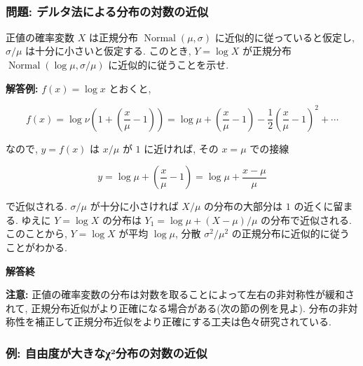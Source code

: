 \documentclass[10pt, a4paper,xelatex,ja=standard]{bxjsarticle}
\newcommand\op{\operatorname}
\begin{document}
    \begin{center}
    \end{center}
    { \hspace*{\fill} \\}
    

    \hypertarget{ux554fux984c-ux30c7ux30ebux30bfux6cd5ux306bux3088ux308bux5206ux5e03ux306eux5bfeux6570ux306eux8fd1ux4f3c}{%
\subsubsection{問題:
デルタ法による分布の対数の近似}\label{ux554fux984c-ux30c7ux30ebux30bfux6cd5ux306bux3088ux308bux5206ux5e03ux306eux5bfeux6570ux306eux8fd1ux4f3c}}

正値の確率変数 \(X\) は正規分布 \(\op{Normal}(\mu, \sigma)\)
に近似的に従っていると仮定し, \(\sigma/\mu\) は十分に小さいと仮定する.
このとき, \(Y = \log X\) が正規分布
\(\op{Normal}(\log \mu, \sigma/\mu)\) に近似的に従うことを示せ.

\textbf{解答例:} \(f(x)=\log x\) とおくと,

\[
f(x) = \log\nu\left(1 + \left(\frac{x}{\mu}-1\right)\right) =
\log\mu + \left(\frac{x}{\mu}-1\right) - \frac{1}{2}\left(\frac{x}{\mu}-1\right)^2 + \cdots
\]

なので, \(y = f(x)\) は \(x/\mu\) が \(1\) に近ければ, その \(x=\mu\)
での接線

\[
y = \log\mu + \left(\frac{x}{\mu}-1\right) =
\log\mu + \frac{x-\mu}{\mu}
\]

で近似される. \(\sigma/\mu\) が十分に小さければ \(X/\mu\)
の分布の大部分は \(1\) の近くに留まる. ゆえに \(Y=\log X\) の分布は
\(Y_1 = \log\mu + (X-\mu)/\mu\) の分布で近似される. このことから,
\(Y=\log X\) が平均 \(\log\mu\), 分散 \(\sigma^2/\mu^2\)
の正規分布に近似的に従うことがわかる.

\textbf{解答終}

\textbf{注意:}
正値の確率変数の分布は対数を取ることによって左右の非対称性が緩和されて,
正規分布近似がより正確になる場合がある(次の節の例を見よ).
分布の非対称性を補正して正規分布近似をより正確にする工夫は色々研究されている.

    \hypertarget{ux4f8b-ux81eaux7531ux5ea6ux304cux5927ux304dux306aux3c7uxb2ux5206ux5e03ux306eux5bfeux6570ux306eux8fd1ux4f3c}{%
\subsubsection{例:
自由度が大きなχ²分布の対数の近似}\label{ux4f8b-ux81eaux7531ux5ea6ux304cux5927ux304dux306aux3c7uxb2ux5206ux5e03ux306eux5bfeux6570ux306eux8fd1ux4f3c}}
\end{document}
